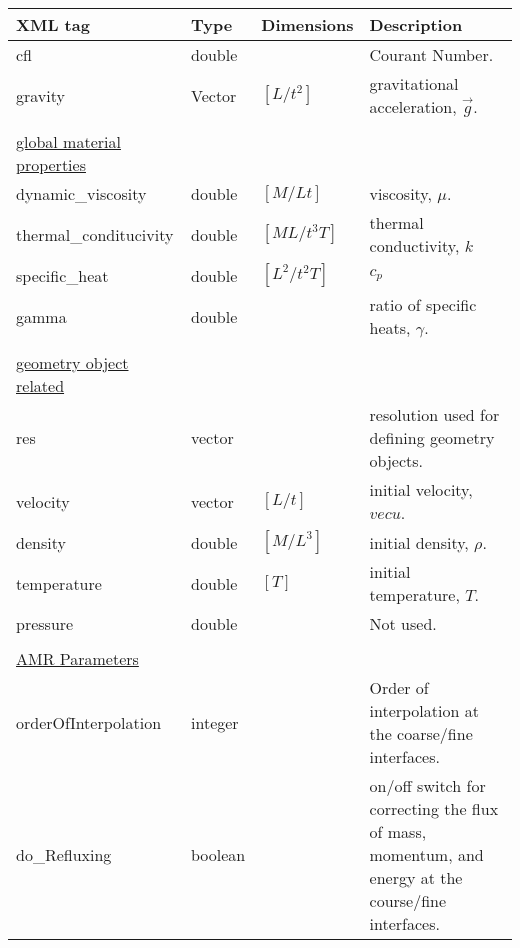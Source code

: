 \begin {center}
\begin{tabular}{lllp{8cm}}
\\
\footnotesize{XML tag} & \footnotesize{Type} & \footnotesize{Dimensions} & \footnotesize{Description}\\
\hline
\hline
cfl                   & double &               &    Courant Number.\\
gravity               & Vector & $[L/t^2]$     &    gravitational acceleration, $\vec{g}$.\\
\\
\underline{\footnotesize{global material properties}} & & &\\
dynamic\_viscosity    & double & $[M/Lt]$      &    viscosity, $\mu$.\\
thermal\_conditucivity& double & $[ML/t^3T]$   &    thermal conductivity, $k$\\
specific\_heat        & double & $ [L^2/t^2 T]$ &   $c_p$\\
gamma                 & double &               &    ratio of specific heats, $\gamma$.\\
\\
\underline{\footnotesize{geometry object related}} & & &\\
res                   & vector &               &    resolution used for defining geometry objects.\\
velocity              & vector & $[L/t]$       &    initial velocity, $vec{u}$.\\
density               & double & $[M/L^3]$     &    initial density, $\rho$.\\
temperature           & double & $[T]$         &    initial temperature, $T$.\\
pressure              & double &               &    Not used. \\
\\
\underline{\footnotesize{AMR Parameters}} & & & \\
orderOfInterpolation  & integer &              &    Order of interpolation at the coarse/fine interfaces. \\
do\_Refluxing         & boolean &              &    on/off switch for correcting the flux of mass, momentum, and energy at the
                                                    course/fine interfaces.\\
\hline
\end{tabular}
\end{center}


